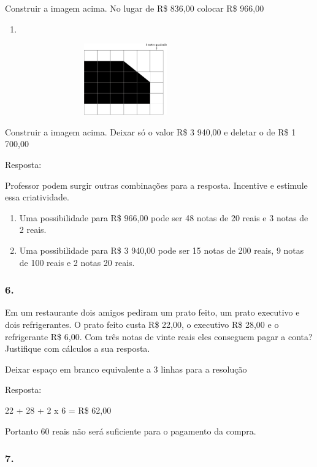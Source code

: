 Construir a imagem acima. No lugar de R\$ 836,00 colocar R\$ 966,00

\begin{enumerate}
\def\labelenumi{\alph{enumi})}
\item
\end{enumerate}

\includegraphics[width=4.10036in,height=1.20844in]{media/image84.png}

Construir a imagem acima. Deixar só o valor R\$ 3 940,00 e deletar o de
R\$ 1 700,00

Resposta:

Professor podem surgir outras combinações para a resposta. Incentive e
estimule essa criatividade.

\begin{enumerate}
\def\labelenumi{\alph{enumi})}
\item
  Uma possibilidade para R\$ 966,00 pode ser 48 notas de 20 reais e 3
  notas de 2 reais.
\item
  Uma possibilidade para R\$ 3 940,00 pode ser 15 notas de 200 reais, 9
  notas de 100 reais e 2 notas 20 reais.
\end{enumerate}

\subsubsection{6.}\label{section-70}

Em um restaurante dois amigos pediram um prato feito, um prato executivo
e dois refrigerantes. O prato feito custa R\$ 22,00, o executivo R\$
28,00 e o refrigerante R\$ 6,00. Com três notas de vinte reais eles
conseguem pagar a conta? Justifique com cálculos a sua resposta.

Deixar espaço em branco equivalente a 3 linhas para a resolução

Resposta:

22 + 28 + 2 x 6 = R\$ 62,00

Portanto 60 reais não será suficiente para o pagamento da compra.

\subsubsection{7.}\label{section-71}

